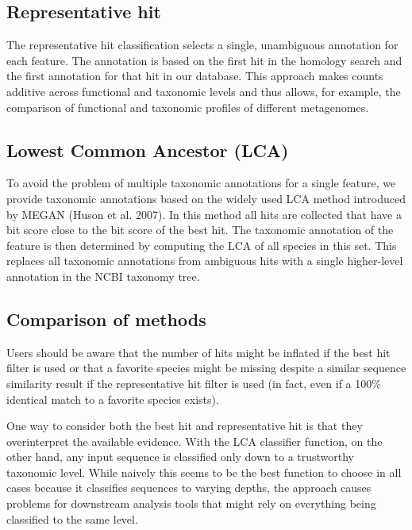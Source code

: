 \documentclass[letterpaper,10pt,english]{sphinxmanual}
\begin{document}
\subsection{Representative hit}
\label{\detokenize{user_manual:representative-hit}}
The representative hit classification selects a single, unambiguous
annotation for each feature. The annotation is based on the first hit in
the homology search and the first annotation for that hit in our
database. This approach makes counts additive across functional and
taxonomic levels and thus allows, for example, the comparison of
functional and taxonomic profiles of different metagenomes.


\subsection{Lowest Common Ancestor (LCA)}
\label{\detokenize{user_manual:lowest-common-ancestor-lca}}\label{\detokenize{user_manual:section-lca}}
To avoid the problem of multiple taxonomic annotations for a single
feature, we provide taxonomic annotations based on the widely used LCA
method introduced by MEGAN (Huson et al. 2007). In this method all hits
are collected that have a bit score close to the bit score of the best
hit. The taxonomic annotation of the feature is then determined by
computing the LCA of all species in this set. This replaces all
taxonomic annotations from ambiguous hits with a single higher-level
annotation in the NCBI taxonomy tree.


\subsection{Comparison of methods}
\label{\detokenize{user_manual:comparison-of-methods}}
Users should be aware that the number of hits might be inflated if the
best hit filter is used or that a favorite species might be missing
despite a similar sequence similarity result if the representative hit
filter is used (in fact, even if a 100\% identical match to a favorite
species exists).

One way to consider both the best hit and representative hit is that
they overinterpret the available evidence. With the LCA classifier
function, on the other hand, any input sequence is classified only down
to a trustworthy taxonomic level. While naively this seems to be the
best function to choose in all cases because it classifies sequences to
varying depths, the approach causes problems for downstream analysis
tools that might rely on everything being classified to the same level.
\end{document}
